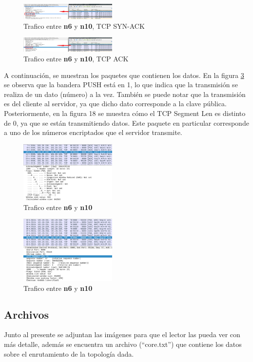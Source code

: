\documentclass[letterpaper, 10 pt, conference]{ieeeconf}  %
\begin{document}
\begin{figure}[H]
	\centering
	\includegraphics[width=0.43\textwidth]{./Imagenes/trafico2.png}
	\caption{Trafico entre \textbf{n6} y \textbf{n10}, TCP SYN-ACK}
	\label{fig:wireshark_2}
\end{figure}

\begin{figure}[H]
	\centering
	\includegraphics[width=0.43\textwidth]{./Imagenes/trafico3.png}
	\caption{Trafico entre \textbf{n6} y \textbf{n10}, TCP ACK}
	\label{fig:wireshark_3}
\end{figure}

A continuación, se muestran los paquetes que contienen los datos. En la figura \ref{fig:wireshark_4} se observa que la bandera PUSH está en 1, lo que indica que la transmisión se realiza de un dato (número) a la vez. También se puede notar que la transmisión es del cliente al servidor, ya que dicho dato corresponde a la clave pública. Posteriormente, en la figura 18 se muestra cómo el TCP Segment Len es distinto de 0, ya que se están transmitiendo datos. Este paquete en particular corresponde a uno de los números encriptados que el servidor transmite. 

\begin{figure}[H]
	\centering
	\includegraphics[width=0.43\textwidth]{./Imagenes/tcp_datos_1.png}
	\caption{Trafico entre \textbf{n6} y \textbf{n10}}
	\label{fig:wireshark_4}
\end{figure}

\begin{figure}[H]
	\centering
	\includegraphics[width=0.43\textwidth]{./Imagenes/tcp_datos_2.png}
	\caption{Trafico entre \textbf{n6} y \textbf{n10}}
	\label{fig:wireshark_5}
\end{figure}

\subsection{Archivos}

Junto al presente se adjuntan las imágenes para que el lector las pueda ver con más detalle, además se encuentra un archivo (``core.txt'') que contiene los datos sobre el enrutamiento de la topología dada.
\end{document}

